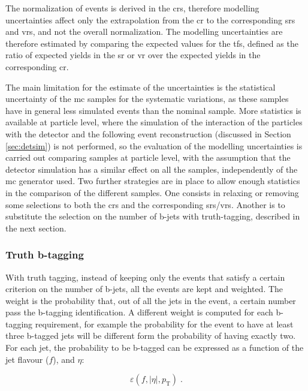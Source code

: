 The normalization of \ttbar events is derived in the \glspl{cr}, therefore modelling uncertainties affect only the extrapolation from 
the \gls{cr} to the corresponding \glspl{sr} and \glspl{vr}, and not the overall normalization. 
The modelling uncertainties are therefore estimated by comparing the expected values for the \glspl{tf}, defined as the ratio of expected yields in the \gls{sr} or \gls{vr} over the expected yields in the corresponding \gls{cr}. 

The main limitation for the estimate of the uncertainties is the statistical uncertainty of the \gls{mc} samples for the systematic variations, as these samples have in general less simulated events than the nominal sample. 
More statistics is available at particle level, where the simulation of the interaction of the particles with the detector and the following event reconstruction (discussed in Section \ref{sec:detsim}) is not performed, so the evaluation of the \ttbar modelling uncertainties is carried out 
comparing samples at particle level, with the assumption that the detector simulation has a similar effect on all the samples, 
independently of the \gls{mc} generator used. Two further strategies are in place to allow enough statistics in the comparison of the different samples. 
One consists in relaxing or removing some selections to both the \glspl{cr} and the corresponding \glspl{sr}/\glspl{vr}. 
Another is to substitute the selection on the number of b-jets with truth-tagging, described in the next section.

\subsubsection*{Truth b-tagging}

With truth tagging, instead of keeping only the events that satisfy a certain criterion on the number of b-jets, all the events are kept and weighted. The weight is the probability that, out of all the jets in the event,
a certain number pass the b-tagging identification.
A different weight is computed for each b-tagging requirement, for example the probability for the event to have at least three b-tagged jets will be different form the probability of having exactly two. 
For each jet, the probability to be b-tagged can be expressed as a function of the jet flavour ($f$), \pt and $\eta$:

\begin{equation}
\varepsilon \left(f,|\eta|,p_{\mathrm{T}}\right) \; .
\label{eq:susy_common:btageff}
\end{equation}

